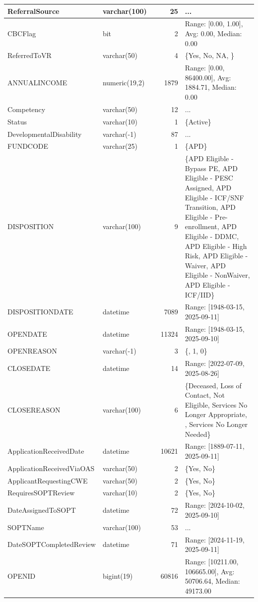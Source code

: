 \begin{landscape}
\begin{longtable}{|l|l|l|r|p{6cm}|}
\hline
ReferralSource & varchar(100) &  & 25 & ... \\
\hline
CBCFlag & bit &  & 2 & Range: [0.00, 1.00], Avg: 0.00, Median: 0.00 \\
\hline
ReferredToVR & varchar(50) &  & 4 & \{Yes, No, NA, \} \\
\hline
ANNUALINCOME & numeric(19,2) &  & 1879 & Range: [0.00, 86400.00], Avg: 1884.71, Median: 0.00 \\
\hline
Competency & varchar(50) &  & 12 & ... \\
\hline
Status & varchar(10) &  & 1 & \{Active\} \\
\hline
DevelopmentalDisability & varchar(-1) &  & 87 & ... \\
\hline
FUNDCODE & varchar(25) &  & 1 & \{APD\} \\
\hline
DISPOSITION & varchar(100) &  & 9 & \{APD Eligible - Bypass PE, APD Eligible - PESC Assigned, APD Eligible - ICF/SNF Transition, APD Eligible - Pre-enrollment, APD Eligible - DDMC, APD Eligible - High Risk, APD Eligible - Waiver, APD Eligible - NonWaiver, APD Eligible - ICF/IID\} \\
\hline
DISPOSITIONDATE & datetime &  & 7089 & Range: [1948-03-15, 2025-09-11] \\
\hline
OPENDATE & datetime &  & 11324 & Range: [1948-03-15, 2025-09-10] \\
\hline
OPENREASON & varchar(-1) &  & 3 & \{, 1, 0\} \\
\hline
CLOSEDATE & datetime &  & 14 & Range: [2022-07-09, 2025-08-26] \\
\hline
CLOSEREASON & varchar(100) &  & 6 & \{Deceased, Loss of Contact, Not Eligible, Services No Longer Appropriate, , Services No Longer Needed\} \\
\hline
ApplicationReceivedDate & datetime &  & 10621 & Range: [1889-07-11, 2025-09-11] \\
\hline
ApplicationReceivedViaOAS & varchar(50) &  & 2 & \{Yes, No\} \\
\hline
ApplicantRequestingCWE & varchar(50) &  & 2 & \{Yes, No\} \\
\hline
RequiresSOPTReview & varchar(10) &  & 2 & \{Yes, No\} \\
\hline
DateAssignedToSOPT & datetime &  & 72 & Range: [2024-10-02, 2025-09-10] \\
\hline
SOPTName & varchar(100) &  & 53 & ... \\
\hline
DateSOPTCompletedReview & datetime &  & 71 & Range: [2024-11-19, 2025-09-11] \\
\hline
OPENID & bigint(19) &  & 60816 & Range: [10211.00, 106665.00], Avg: 50706.64, Median: 49173.00 \\

\end{longtable}
\end{landscape}
